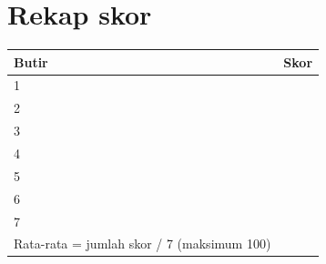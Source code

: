 \documentclass[10pt,a4paper]{article}
\begin{document}
\section*{Rekap skor}
\noindent
\begin{tabular}{@{}lr@{}}
\toprule
Butir & Skor \\
\midrule
1 & \\
2 & \\
3 & \\
4 & \\
5 & \\
6 & \\
7 & \\
\midrule
Rata-rata = jumlah skor / 7 (maksimum 100) & \\
\bottomrule
\end{tabular}
\end{document}
